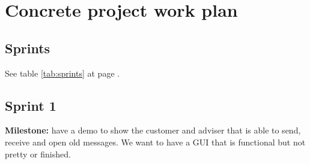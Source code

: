 

\section{Concrete project work plan}

\subsection*{Sprints}
See table \ref{tab:sprints} at page \pageref{tab:sprints}.

\subsection{Sprint 1}
\textbf{Milestone:} have a demo to show the customer and adviser that is able to send, receive and open old messages. We want to have a GUI that is functional but not pretty or finished.


